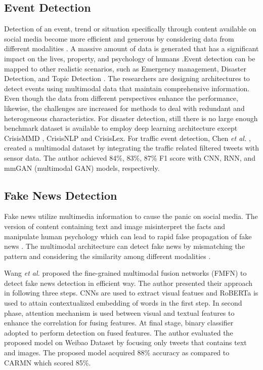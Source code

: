 \documentclass[conference]{IEEEtran}
\begin{document}
\subsection{Event Detection}
 Detection of an event, trend or situation specifically through content available on social media become more efficient and generous by considering data from different modalities \cite{hu2017adaptive}. A massive amount of data is generated that has a significant impact on the lives, property, and psychology of humans \cite{algiriyage2022multi}.Event detection can be mapped to other realistic scenarios, such as Emergency management, Disaster Detection, and Topic Detection \cite{xiao2022survey}. The researchers are designing architectures to detect events using multimodal data that maintain comprehensive information. Even though the data from different perspectives enhance the performance, likewise,  the challenges are increased for methods to deal with redundant and heterogeneous characteristics.       
For disaster detection, still there is no large enough benchmark dataset is available to employ deep learning architecture except CrisisMMD \cite{alam2018crisismmd}, CrisisNLP and CrisisLex.
For traffic event detection, Chen \textit{et al.} \cite{chen2021multi} , created a multimodal dataset by integrating the traffic related filtered tweets with sensor data. The author achieved 84\%, 83\%, 87\% F1 score with CNN, RNN, and mmGAN (multimodal GAN) models, respectively.  

\subsection{Fake News Detection}
Fake news utilize multimedia information to cause the panic on social media. The version of content containing text and image misinterpret the facts and manipulate human psychology which can lead to rapid false propagation of fake news \cite{jin2017multimodal}. The multimodal architecture can detect fake news by mismatching the pattern and considering the similarity among different modalities \cite{zhou2020safe}.

Wang \textit{et al.} \cite{wang2022fmfn} proposed the fine-grained multimodal fusion networks (FMFN) to detect fake news detection in efficient way. The author presented their approach in following three steps. CNNs are used to extract visual featues and RoBERTa \cite{liu2019roberta} is used to attain contextualized embedding of words in the first step. In second phase, attention mechanism is used between visual and textual features to enhance the correlation for fusing features. At final stage, binary classifier adopted to perform detection on fused features.  
The author evaluated the proposed model on Weibao Dataset \cite{jin2017multimodal} by focusing only tweets that contains text and images. The proposed model acquired 88\% accuracy as compared to CARMN which scored 85\%.   
\end{document}

